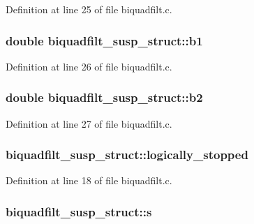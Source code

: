 Definition at line 25 of file biquadfilt.\+c.

\subsubsection[{\texorpdfstring{b1}{b1}}]{\setlength{\rightskip}{0pt plus 5cm}double biquadfilt\+\_\+susp\+\_\+struct\+::b1}\hypertarget{structbiquadfilt__susp__struct_adc255cd522e67c799a84905430ce018f}{}\label{structbiquadfilt__susp__struct_adc255cd522e67c799a84905430ce018f}


Definition at line 26 of file biquadfilt.\+c.

\subsubsection[{\texorpdfstring{b2}{b2}}]{\setlength{\rightskip}{0pt plus 5cm}double biquadfilt\+\_\+susp\+\_\+struct\+::b2}\hypertarget{structbiquadfilt__susp__struct_aaba4fa6f052901ead0257308900ae7f4}{}\label{structbiquadfilt__susp__struct_aaba4fa6f052901ead0257308900ae7f4}


Definition at line 27 of file biquadfilt.\+c.

\subsubsection[{\texorpdfstring{logically\+\_\+stopped}{logically_stopped}}]{ biquadfilt\+\_\+susp\+\_\+struct\+::logically\+\_\+stopped}\hypertarget{structbiquadfilt__susp__struct_acadaa74c0ada5c33f978d6c9f2a1de26}{}\label{structbiquadfilt__susp__struct_acadaa74c0ada5c33f978d6c9f2a1de26}


Definition at line 18 of file biquadfilt.\+c.

\subsubsection[{\texorpdfstring{s}{s}}]{ biquadfilt\+\_\+susp\+\_\+struct\+::s}\hypertarget{structbiquadfilt__susp__struct_a1882840b888e7b5501ea0cd89bf2af60}{}\label{structbiquadfilt__susp__struct_a1882840b888e7b5501ea0cd89bf2af60}


